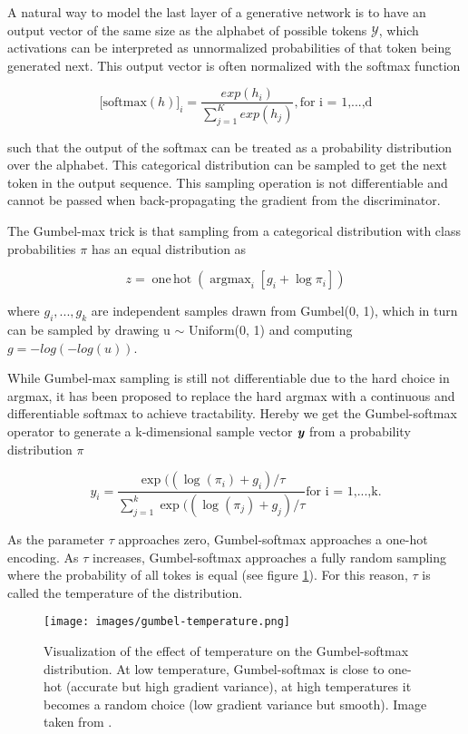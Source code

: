 \documentclass[a4paper,conference]{IEEEtran}
\DeclareMathOperator*{\argmax}{\arg\max}
\DeclareMathOperator*{\onehot}{one\,hot}
\def\mathbi#1{\textbf{\em #1}}
\begin{document}
A natural way to model the last layer of a generative network is to have an output vector of the same size as the alphabet of possible tokens $\mathcal{Y}$, which activations can be interpreted as unnormalized probabilities of that token being generated next. This output vector is often normalized with the softmax function

\begin{dmath}
\big[ \text{softmax}(h)\big]_i = \frac{exp(h_i)}{\sum_{j=1}^Kexp(h_j)}, {\text{for i = 1,...,d}}
\end{dmath}

such that the output of the softmax can be treated as a probability distribution over the alphabet. This categorical distribution can be sampled to get the next token in the output sequence. This sampling operation is not differentiable and cannot be passed when back-propagating the gradient from the discriminator.

The Gumbel-max trick \cite{c15} is that sampling from a categorical distribution with class probabilities $\pi$ has an equal distribution as

\begin{dmath}
z = \onehot{}(\argmax_i[g_i + \log \pi_i])
\end{dmath}

where $g_i,...,g_k$ are independent samples drawn from Gumbel(0, 1), which in turn can be sampled by drawing u $\sim$ Uniform(0, 1) and computing $g = − log(− log(u))$.

While Gumbel-max sampling is still not differentiable due to the hard choice in argmax, it has been proposed \cite{c14} to replace the hard argmax with a continuous and differentiable softmax to achieve tractability. Hereby we get the Gumbel-softmax operator to generate a k-dimensional sample vector $\mathbi{y}$ from a probability distribution $\pi$

\begin{dmath}
y_i = \frac{\exp((\log(\pi_i) + g_i)/\tau}{\sum_{j=1}^k\exp((\log(\pi_j)+g_j)/\tau} \text{for i = 1,...,k}.
\end{dmath}

As the parameter $\tau$ approaches zero, Gumbel-softmax approaches a one-hot encoding. As $\tau$ increases, Gumbel-softmax approaches a fully random sampling where the probability of all tokes is equal (see figure \ref{fig:gumbel-temp}). For this reason, $\tau$ is called the temperature of the distribution.

   \begin{figure}[thpb]
      \centering
      \texttt{[image: images/gumbel-temperature.png]}
      \caption{Visualization of the effect of temperature on the Gumbel-softmax distribution. At low temperature, Gumbel-softmax is close to one-hot (accurate but high gradient variance), at high temperatures it becomes a random choice (low gradient variance but smooth). Image taken from \cite{c14}.}
      \label{fig:gumbel-temp}
   \end{figure}
   
\end{document}
